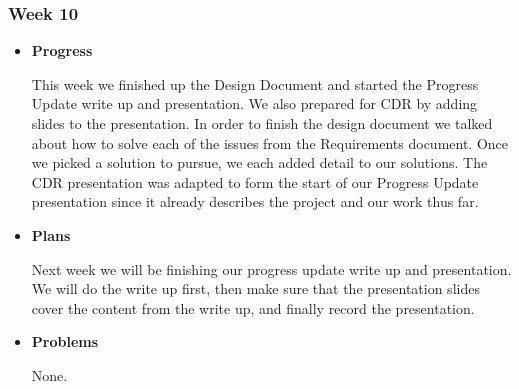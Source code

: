 \subsubsection{Week 10}
\begin{itemize}
\item{
\textbf{Progress}

This week we finished up the Design Document and started the Progress Update write up and presentation. We also prepared for CDR by adding slides to the presentation. In order to finish the design document we talked about how to solve each of the issues from the Requirements document. Once we picked a solution to pursue, we each added detail to our solutions. The CDR presentation was adapted to form the start of our Progress Update presentation since it already describes the project and our work thus far.
}
\item{
\textbf{Plans}

Next week we will be finishing our progress update write up and presentation. We will do the write up first, then make sure that the presentation slides cover the content from the write up, and finally record the presentation.
}
\item{
\textbf{Problems}

None.
}
\end{itemize}
